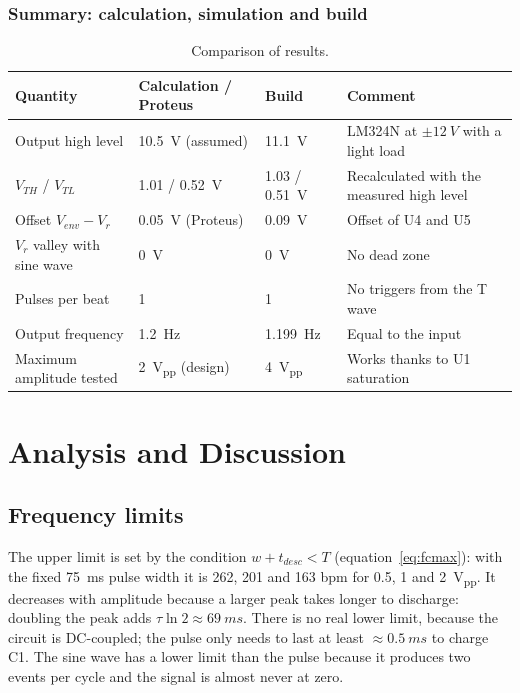 \documentclass[11pt,letterpaper]{article}
\newcommand{\Vr}{V_r}
\newcommand{\Venv}{V_{env}}
\newcommand{\VTH}{V_{TH}}
\newcommand{\VTL}{V_{TL}}
\begin{document}
\subsubsection{Summary: calculation, simulation and build}

\begin{table}[H]
\centering
\caption{Comparison of results.}\label{tab:labcomparison}
\small
\begin{tabularx}{\linewidth}{@{}>{\raggedright}p{3.3cm}>{\raggedright}p{2.7cm}>{\raggedright}p{2.4cm}X@{}}
\toprule
Quantity & Calculation / Proteus & Build & Comment \\
\midrule
Output high level & \SI{10.5}{V} (assumed) & \SI{11.1}{V} & LM324N at $\pm\SI{12}{V}$ with a light load \\
$\VTH$ / $\VTL$ & 1.01 / \SI{0.52}{V} & 1.03 / \SI{0.51}{V} & Recalculated with the measured high level \\
Offset $\Venv-\Vr$ & \SI{0.05}{V} (Proteus) & \SI{0.09}{V} & Offset of U4 and U5 \\
$\Vr$ valley with sine wave & \SI{0}{V} & \SI{0}{V} & No dead zone \\
Pulses per beat & 1 & 1 & No triggers from the T wave \\
Output frequency & \SI{1.2}{Hz} & \SI{1.199}{Hz} & Equal to the input \\
Maximum amplitude tested & \SI{2}{V_{pp}} (design) & \SI{4}{V_{pp}} & Works thanks to U1 saturation \\
\bottomrule
\end{tabularx}
\end{table}

\section{Analysis and Discussion}

\subsection{Frequency limits}
The upper limit is set by the condition $w+t_{desc}<T$ (equation~\ref{eq:fcmax}): with the fixed \SI{75}{ms} pulse width it is 262, 201 and 163 bpm for 0.5, 1 and \SI{2}{V_{pp}}. It decreases with amplitude because a larger peak takes longer to discharge: doubling the peak adds $\tau\ln2\approx\SI{69}{ms}$. There is no real lower limit, because the circuit is DC-coupled; the pulse only needs to last at least $\approx\SI{0.5}{ms}$ to charge C1. The sine wave has a lower limit than the pulse because it produces two events per cycle and the signal is almost never at zero.
\end{document}
